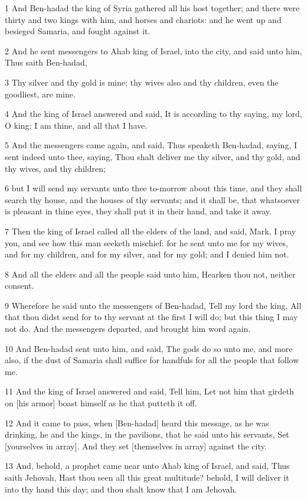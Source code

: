 \par 1 And Ben-hadad the king of Syria gathered all his host together; and there were thirty and two kings with him, and horses and chariots: and he went up and besieged Samaria, and fought against it.
\par 2 And he sent messengers to Ahab king of Israel, into the city, and said unto him, Thus saith Ben-hadad,
\par 3 Thy silver and thy gold is mine; thy wives also and thy children, even the goodliest, are mine.
\par 4 And the king of Israel answered and said, It is according to thy saying, my lord, O king; I am thine, and all that I have.
\par 5 And the messengers came again, and said, Thus speaketh Ben-hadad, saying, I sent indeed unto thee, saying, Thou shalt deliver me thy silver, and thy gold, and thy wives, and thy children;
\par 6 but I will send my servants unto thee to-morrow about this time, and they shall search thy house, and the houses of thy servants; and it shall be, that whatsoever is pleasant in thine eyes, they shall put it in their hand, and take it away.
\par 7 Then the king of Israel called all the elders of the land, and said, Mark, I pray you, and see how this man seeketh mischief: for he sent unto me for my wives, and for my children, and for my silver, and for my gold; and I denied him not.
\par 8 And all the elders and all the people said unto him, Hearken thou not, neither consent.
\par 9 Wherefore he said unto the messengers of Ben-hadad, Tell my lord the king, All that thou didst send for to thy servant at the first I will do; but this thing I may not do. And the messengers departed, and brought him word again.
\par 10 And Ben-hadad sent unto him, and said, The gods do so unto me, and more also, if the dust of Samaria shall suffice for handfuls for all the people that follow me.
\par 11 And the king of Israel answered and said, Tell him, Let not him that girdeth on [his armor] boast himself as he that putteth it off.
\par 12 And it came to pass, when [Ben-hadad] heard this message, as he was drinking, he and the kings, in the pavilions, that he said unto his servants, Set [yourselves in array]. And they set [themselves in array] against the city.
\par 13 And, behold, a prophet came near unto Ahab king of Israel, and said, Thus saith Jehovah, Hast thou seen all this great multitude? behold, I will deliver it into thy hand this day; and thou shalt know that I am Jehovah.
